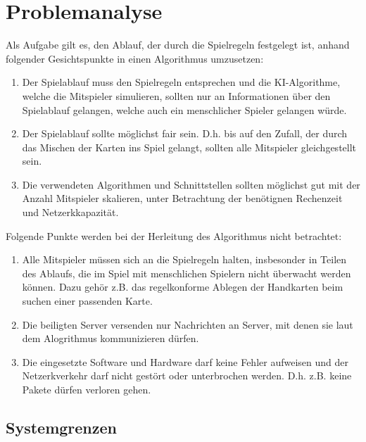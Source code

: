 \section{Problemanalyse}   %


Als Aufgabe gilt es, den Ablauf, der durch die Spielregeln festgelegt ist, anhand folgender Gesichtspunkte in einen Algorithmus umzusetzen:

\begin{enumerate}
	\item Der Spielablauf muss den Spielregeln entsprechen und die KI-Algorithme, welche die Mitspieler simulieren, sollten nur an Informationen über den Spielablauf gelangen, welche auch ein menschlicher Spieler gelangen würde.
	\item Der Spielablauf sollte möglichst fair sein. D.h. bis auf den Zufall, der durch das Mischen der Karten ins Spiel gelangt, sollten alle Mitspieler gleichgestellt sein.
	\item Die verwendeten Algorithmen und Schnittstellen sollten möglichst gut mit der Anzahl Mitspieler skalieren, unter Betrachtung der benötignen Rechenzeit und Netzerkkapazität.
\end{enumerate}

Folgende Punkte werden bei der Herleitung des Algorithmus nicht betrachtet:

\begin{enumerate}
	\item Alle Mitspieler müssen sich an die Spielregeln halten, insbesonder in Teilen des Ablaufs, die im Spiel mit menschlichen Spielern nicht überwacht werden können. Dazu gehör z.B. das regelkonforme Ablegen der Handkarten beim suchen einer passenden Karte.
	\item Die beiligten Server versenden nur Nachrichten an Server, mit denen sie laut dem Alogrithmus kommunizieren dürfen.
	\item Die eingesetzte Software und Hardware darf keine Fehler aufweisen und der Netzerkverkehr darf nicht gestört oder unterbrochen werden. D.h. z.B. keine Pakete dürfen verloren gehen.
\end{enumerate}


\subsection{Systemgrenzen}

